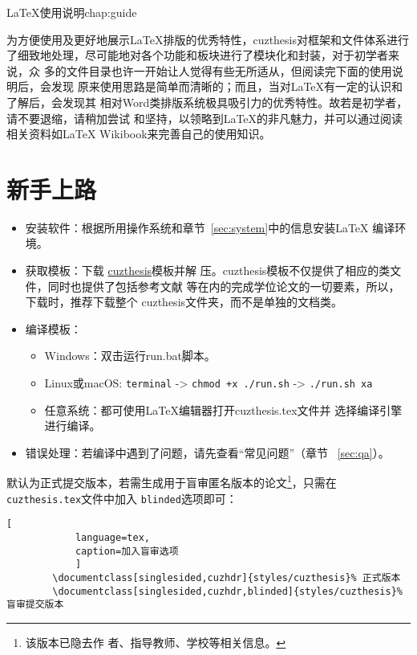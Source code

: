\begin{cuzchapter}{\LaTeX{}使用说明}{chap:guide}

	为方便使用及更好地展示\LaTeX{}排版的优秀特性，cuzthesis对框架和文件体系进行
	了细致地处理，尽可能地对各个功能和板块进行了模块化和封装，对于初学者来说，众
	多的文件目录也许一开始让人觉得有些无所适从，但阅读完下面的使用说明后，会发现
	原来使用思路是简单而清晰的；而且，当对\LaTeX{}有一定的认识和了解后，会发现其
	相对Word类排版系统极具吸引力的优秀特性。故若是初学者，请不要退缩，请稍加尝试
	和坚持，以领略到\LaTeX{}的非凡魅力，并可以通过阅读相关资料如\LaTeX{}
	Wikibook\citep{wikibook2014latex}来完善自己的使用知识。

	\section{新手上路}\label{sec:newbie}

	\begin{itemize}
		\item 安装软件：根据所用操作系统和章节~\ref{sec:system}中的信息安装\LaTeX{}
		      编译环境。
		\item 获取模板：下载
		      \href{https://github.com/xiehao/CUZThesis}{cuzthesis}模板并解
		      压。cuzthesis模板不仅提供了相应的类文件，同时也提供了包括参考文献
		      等在内的完成学位论文的一切要素，所以，下载时，推荐下载整个
		      cuzthesis文件夹，而不是单独的文档类。
		\item 编译模板：
		      \begin{itemize}
			      \item Windows：双击运行run.bat脚本。
			      \item Linux或macOS: {\small \verb|terminal| -> \verb|chmod +x ./run.sh| -> \verb|./run.sh xa|}
			      \item 任意系统：都可使用\LaTeX{}编辑器打开cuzthesis.tex文件并
			            选择编译引擎进行编译。
		      \end{itemize}
		\item 错误处理：若编译中遇到了问题，请先查看“常见问题”（章节
		      ~\ref{sec:qa}）。
	\end{itemize}

	默认为正式提交版本，若需生成用于盲审匿名版本的论文\footnote{该版本已隐去作
		者、指导教师、学校等相关信息。}，只需在\texttt{cuzthesis.tex}文件中加入
	\texttt{blinded}选项即可：
	\begin{lstlisting}[
            language=tex,
            caption=加入盲审选项
            ]
        \documentclass[singlesided,cuzhdr]{styles/cuzthesis}% 正式版本
        \documentclass[singlesided,cuzhdr,blinded]{styles/cuzthesis}% 盲审提交版本
    \end{lstlisting}


\end{cuzchapter}
